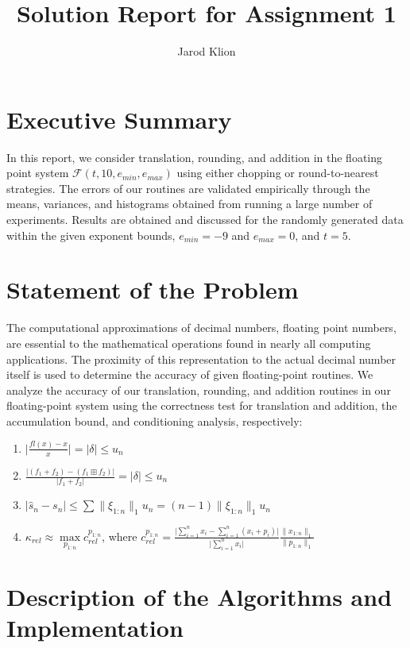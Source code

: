 \documentclass[11pt]{article}
\author{Jarod Klion}
\title{Solution Report for Assignment 1}
\newcommand{\norm}[1]{\lVert#1\rVert}
\newcommand{\abs}[1]{\lvert#1\rvert}
\begin{document}
\maketitle

\section{Executive Summary}

In this report, we consider translation, rounding, and addition in the floating point system $\mathcal{F}(t, 10, e_{min}, e_{max})$ using either chopping or round-to-nearest strategies. The errors of our routines are validated empirically through the means, variances, and histograms obtained from running a large number of experiments. Results are obtained and discussed for the randomly generated data within the given exponent bounds, $e_{min} = -9$ and $e_{max} = 0$, and $t = 5$.

\section{Statement of the Problem}

The computational approximations of decimal numbers, floating point numbers, are essential to the mathematical operations found in nearly all computing applications. The proximity of this representation to the actual decimal number itself is used to determine the accuracy of given floating-point routines. We analyze the accuracy of our translation, rounding, and addition routines in our floating-point system using the correctness test for translation and addition, the accumulation bound, and conditioning analysis, respectively:
\begin{enumerate}
	\item $\abs{\frac{fl(x) - x}{x}} = \abs{\delta} \leq u_n$
	\item $ \frac{\abs{(f_1 + f_2) - (f_1 \boxplus f_2)}}{\abs{f_1 + f_2}} = \abs{\delta} \leq u_n$
	\item $\abs{\hat{s}_n - s_n} \leq \sum \norm{\xi_{1:n}}_1 u_n = (n-1)\norm{\xi_{1:n}}_1 u_n$
	\item $\kappa_{rel} \approx \max\limits_{p_{1:n}} c_{rel}^{p_{1:n}}$, where $c_{rel}^{p_{1:n}} = \frac{\abs{\sum_{i=1}^{n} x_i - \sum_{i=1}^{n} (x_i + p_i)}}{\abs{\sum_{i=1}^{n} x_i}}\frac{\norm{x_{1:n}}_1}{\norm{p_{1:n}}_1}$
\end{enumerate}

\section{Description of the Algorithms and Implementation}
\end{document}

